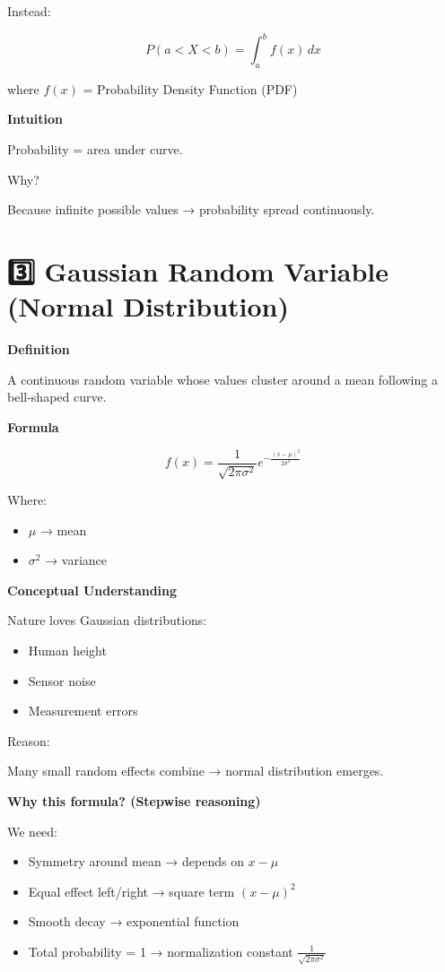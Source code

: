\documentclass[12pt,a4paper]{article}
\begin{document}
Instead:

\[
P(a < X < b) = \int_a^b f(x)\,dx
\]

where $f(x)$ = Probability Density Function (PDF)

\textbf{Intuition}

Probability = area under curve.

Why?

Because infinite possible values → probability spread continuously.

\section*{3️⃣ Gaussian Random Variable (Normal Distribution)}

\textbf{Definition}

A continuous random variable whose values cluster around a mean following a bell-shaped curve.

\textbf{Formula}

\[
f(x) = \frac{1}{\sqrt{2\pi\sigma^2}} e^{-\frac{(x-\mu)^2}{2\sigma^2}}
\]

Where:

\begin{itemize}
\item $\mu$ → mean
\item $\sigma^2$ → variance
\end{itemize}

\textbf{Conceptual Understanding}

Nature loves Gaussian distributions:

\begin{itemize}
\item Human height
\item Sensor noise
\item Measurement errors
\end{itemize}

Reason:

Many small random effects combine → normal distribution emerges.

\textbf{Why this formula? (Stepwise reasoning)}

We need:

\begin{itemize}
\item Symmetry around mean → depends on $x-\mu$
\item Equal effect left/right → square term $(x-\mu)^2$
\item Smooth decay → exponential function
\item Total probability = 1 → normalization constant $\frac{1}{\sqrt{2\pi\sigma^2}}$
\end{itemize}
\end{document}
